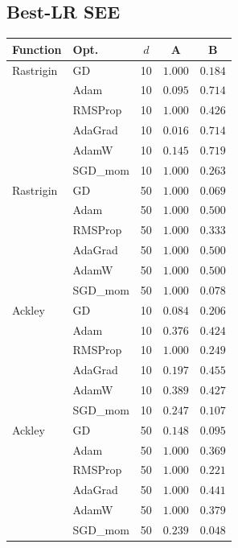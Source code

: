 \documentclass[11pt]{article}
\begin{document}
\subsection{Best-LR SEE}

\begin{center}
\small
\begin{tabular}{llccc}
\toprule
Function & Opt. & $d$ & A & B \\
\midrule
Rastrigin & GD      & 10 & $1.000$ & $0.184$ \\
          & Adam    & 10 & $0.095$ & $0.714$ \\
          & RMSProp & 10 & $1.000$ & $0.426$ \\
          & AdaGrad & 10 & $0.016$ & $0.714$ \\
          & AdamW   & 10 & $0.145$ & $0.719$ \\
          & SGD\_mom& 10 & $1.000$ & $0.263$ \\
\midrule
Rastrigin & GD      & 50 & $1.000$ & $0.069$ \\
          & Adam    & 50 & $1.000$ & $0.500$ \\
          & RMSProp & 50 & $1.000$ & $0.333$ \\
          & AdaGrad & 50 & $1.000$ & $0.500$ \\
          & AdamW   & 50 & $1.000$ & $0.500$ \\
          & SGD\_mom& 50 & $1.000$ & $0.078$ \\
\midrule
Ackley    & GD      & 10 & $0.084$ & $0.206$ \\
          & Adam    & 10 & $0.376$ & $0.424$ \\
          & RMSProp & 10 & $1.000$ & $0.249$ \\
          & AdaGrad & 10 & $0.197$ & $0.455$ \\
          & AdamW   & 10 & $0.389$ & $0.427$ \\
          & SGD\_mom& 10 & $0.247$ & $0.107$ \\
\midrule
Ackley    & GD      & 50 & $0.148$ & $0.095$ \\
          & Adam    & 50 & $1.000$ & $0.369$ \\
          & RMSProp & 50 & $1.000$ & $0.221$ \\
          & AdaGrad & 50 & $1.000$ & $0.441$ \\
          & AdamW   & 50 & $1.000$ & $0.379$ \\
          & SGD\_mom& 50 & $0.239$ & $0.048$ \\
\bottomrule
\end{tabular}
\end{center}
\end{document}
